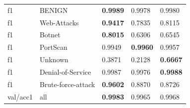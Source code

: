 \begin{table}[!ht]
\begin{adjustbox}{max width=.75\textwidth}
\begin{tabular}{lllll}
        f1 & BENIGN & \textbf{0.9989} & 0.9978  & 0.9980  \\
        f1 & Web-Attacks & \textbf{0.9417} & 0.7835  & 0.8115  \\
        f1 & Botnet & \textbf{0.8015} & 0.6306  & 0.6545  \\
        f1 & PortScan & 0.9949  & \textbf{0.9960} & 0.9957  \\
        f1 & Unknown & 0.3871  & 0.2128  & \textbf{0.6667} \\
        f1 & Denial-of-Service & 0.9987  & 0.9976  & \textbf{0.9988} \\
        f1 & Brute-force-attack & \textbf{0.9602} & 0.8870  & 0.8726  \\
        val/acc1 & all & \textbf{0.9983} & 0.9965  & 0.9968  \\
        \bottomrule
    \hline
    \end{tabular}
    \end{adjustbox}
    \label{tab:pe-tr-tr}
\end{table}


